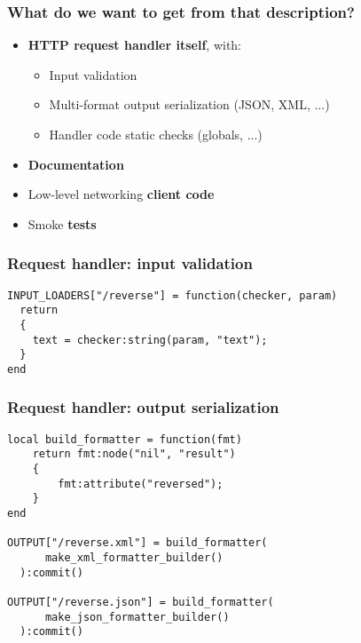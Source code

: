 \documentclass[handout]{beamer}
\begin{document}
\begin{frame}

\frametitle{What do we want to get from that description?}

\begin{itemize}
\item \textbf{HTTP request handler itself}, with:
  \begin{itemize}
  \item Input validation
  \item Multi-format output serialization (JSON, XML, ...)
  \item Handler code static checks (globals, ...)
  \end{itemize}
\item \textbf{Documentation}
\item Low-level networking \textbf{client code}
\item Smoke \textbf{tests}
\end{itemize}

\end{frame}


\begin{frame}[fragile]

\frametitle{Request handler: input validation}

\begin{verbatim}
INPUT_LOADERS["/reverse"] = function(checker, param)
  return
  {
    text = checker:string(param, "text");
  }
end
\end{verbatim}

\end{frame}


\begin{frame}[fragile]

\frametitle{Request handler: output serialization}

\begin{verbatim}
local build_formatter = function(fmt)
    return fmt:node("nil", "result")
    {
        fmt:attribute("reversed");
    }
end

OUTPUT["/reverse.xml"] = build_formatter(
      make_xml_formatter_builder()
  ):commit()

OUTPUT["/reverse.json"] = build_formatter(
      make_json_formatter_builder()
  ):commit()
\end{verbatim}

\end{frame}
\end{document}
